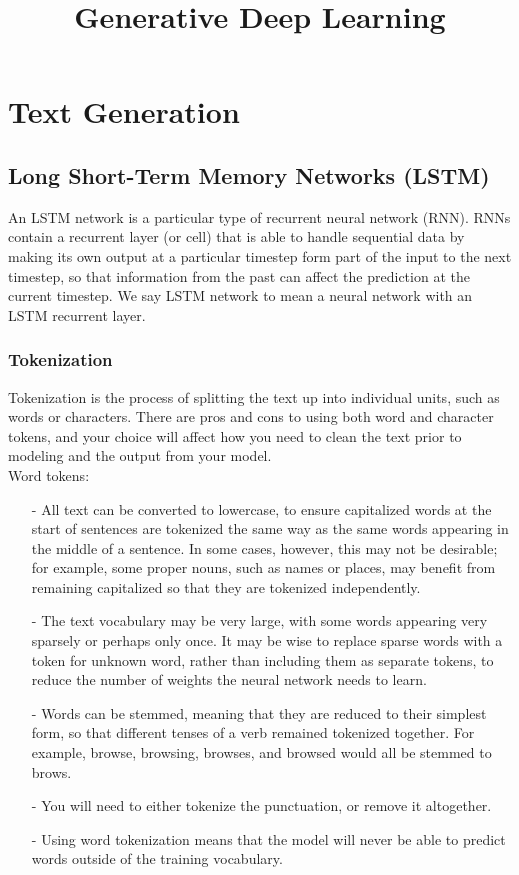 \documentclass[french]{article}
\title{Generative Deep Learning}
\begin{document}
\date{}

\maketitle

\section{Text Generation}

\subsection{Long Short-Term Memory Networks (LSTM)}

An LSTM network is a particular type of recurrent neural network (RNN). RNNs contain a recurrent layer (or cell) that is able to handle sequential data by making its own output at a particular timestep form part of the input to the next timestep, so that information from the past can affect the prediction at the current timestep. We say LSTM network to mean a neural network with an LSTM recurrent layer.

\subsubsection{Tokenization}

Tokenization is the process of splitting the text up into individual units, such as words or characters. There are pros and cons to using both word and character tokens, and your choice will affect how you need to clean the text prior to modeling and the output from your model.\\

Word tokens:
\begin{itemize}
 \item[-] All text can be converted to lowercase, to ensure capitalized words at the start of sentences are tokenized the same way as the same words appearing in the middle of a sentence. In some cases, however, this may not be desirable; for example, some proper nouns, such as names or places, may benefit from remaining capitalized so that they are tokenized independently.
\item[-] The text vocabulary  may be very large, with some words appearing very sparsely or perhaps only once. It may be wise to replace sparse words with a token for unknown word, rather than including them as separate tokens, to reduce the number of weights the neural network needs to learn.
\item[-] Words can be stemmed, meaning that they are reduced to their simplest form, so that different tenses of a verb remained tokenized together. For example, browse, browsing, browses, and browsed would all be stemmed to brows.
\item[-] You will need to either tokenize the punctuation, or remove it altogether.
\item[-] Using word tokenization means that the model will never be able to predict words outside of the training vocabulary.
\end{itemize}
\end{document}
